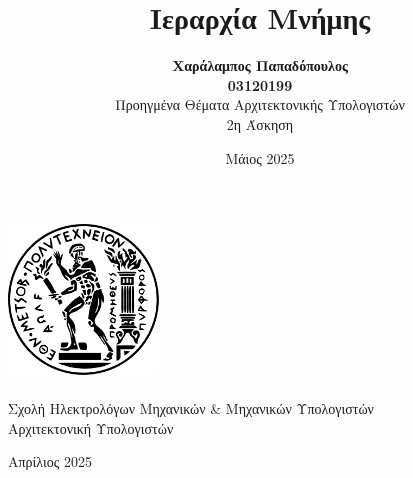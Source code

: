 \documentclass{article}
\title{\Huge Ιεραρχία Μνήμης}
\author{
  \textbf{Χαράλαμπος Παπαδόπουλος\\ 03120199} \\[3cm]
  {Προηγμένα Θέματα Αρχιτεκτονικής Υπολογιστών\\ 2η Άσκηση} \\
}
\date{Μάιος 2025}
\begin{document}
\begin{titlepage}
    \centering
    \vspace{3cm}

    \includegraphics[width=4cm]{figures/emp.png}\\
    \vspace{1.5cm}
    {\fontsize{24pt}{20pt}\selectfont{Εθνικό Μετσόβιο Πολυτεχνείο}}\\[0.3cm]
    {\fontsize{16pt}{18pt}\selectfont Σχολή Ηλεκτρολόγων Μηχανικών \& Μηχανικών Υπολογιστών}\\[0.3cm]
    {\fontsize{16pt}{18pt}\selectfont Αρχιτεκτονική Υπολογιστών}\\[2cm]

    {\Huge\bfseries \thetitle \par}
    \vspace{2cm}
    {\Large \theauthor \par}
    \vfill

    {\fontsize{15pt}{18pt}Απρίλιος 2025}
\end{titlepage}
\end{document}
